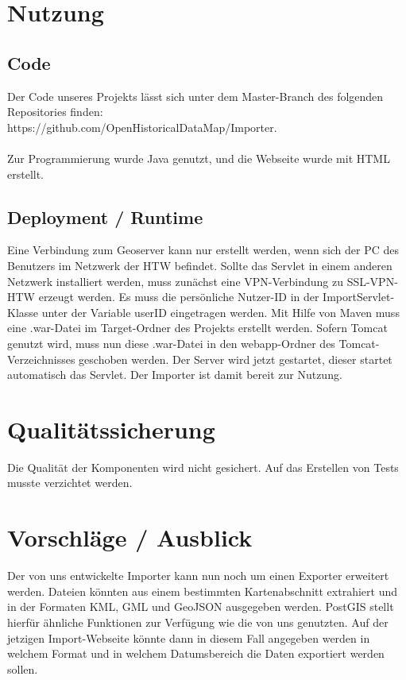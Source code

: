 \documentclass[]{article}
\begin{document}
\section{Nutzung}
\subsection{Code}
Der Code unseres Projekts lässt sich unter dem Master-Branch des folgenden Repositories finden: \\https://github.com/OpenHistoricalDataMap/Importer. \\
\\
Zur Programmierung wurde Java genutzt, und die Webseite wurde mit HTML erstellt.

\subsection{Deployment / Runtime}
Eine Verbindung zum Geoserver kann nur erstellt werden, wenn sich der PC des Benutzers im Netzwerk der HTW befindet. Sollte das Servlet in einem anderen Netzwerk installiert werden, muss zunächst eine VPN-Verbindung zu SSL-VPN-HTW erzeugt werden. 
Es muss die persönliche Nutzer-ID in der ImportServlet-Klasse unter der Variable userID eingetragen werden.
Mit Hilfe von Maven muss eine .war-Datei im Target-Ordner des Projekts erstellt werden. Sofern Tomcat genutzt wird, muss nun diese .war-Datei in den webapp-Ordner des Tomcat-Verzeichnisses geschoben werden. Der Server wird jetzt gestartet, dieser startet automatisch das Servlet. Der Importer ist damit bereit zur Nutzung.

\section{Qualitätssicherung}
Die Qualität der Komponenten wird nicht gesichert. Auf das Erstellen von Tests musste verzichtet werden.


\section{Vorschläge / Ausblick}
Der von uns entwickelte Importer kann nun noch um einen Exporter erweitert werden. Dateien könnten aus einem bestimmten Kartenabschnitt extrahiert und in der Formaten KML, GML und GeoJSON ausgegeben werden. PostGIS stellt hierfür ähnliche Funktionen zur Verfügung wie die von uns genutzten. Auf der jetzigen Import-Webseite könnte dann in diesem Fall angegeben werden in welchem Format und in welchem Datumsbereich die Daten exportiert werden sollen.
\end{document}
